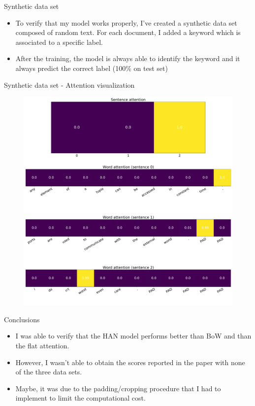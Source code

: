 \documentclass[10pt]{beamer}
\begin{document}
\begin{frame}{Synthetic data set}

\begin{itemize}
\item
To verify that my model works properly, I've created a synthetic data set composed of random text. For each document, I added a keyword which is associated to a specific label.
\item
After the training, the model is always able to identify the keyword and it always predict the correct label (100\% on test set)
\end{itemize}

\end{frame}

\begin{frame}{Synthetic data set - Attention visualization}

\begin{figure}
\centering
\includegraphics[scale=0.15]{img/synthetic-han-visual}
\end{figure}

\end{frame}

\begin{frame}{Conclusions}

\begin{itemize}
\item
I was able to verify that the HAN model performs better than BoW and than the flat attention.
\item
However, I wasn't able to obtain the scores reported in the paper with none of the three data sets.
\item
Maybe, it was due to the padding/cropping procedure that I had to implement to limit the computational cost.
\end{itemize}

\end{frame}
\end{document}
